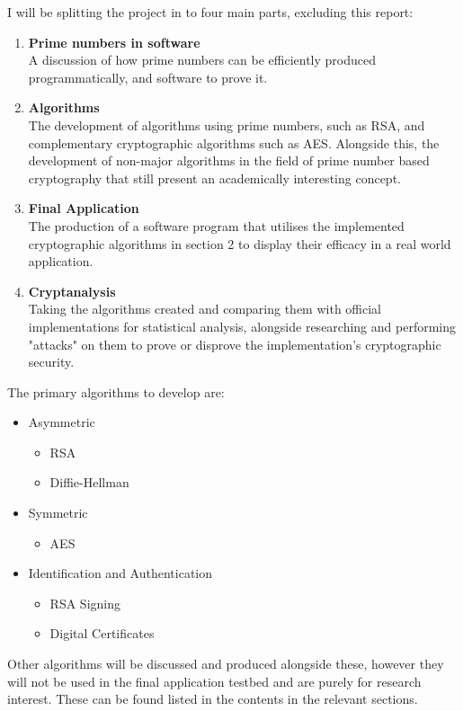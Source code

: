 I will be splitting the project in to four main parts, excluding this report:

\begin{enumerate}
	\item \textbf{Prime numbers in software} \\
		A discussion of how prime numbers can be efficiently produced programmatically, and software to prove it.
	\item \textbf{Algorithms} \\
		The development of algorithms using prime numbers, such as RSA, and complementary cryptographic algorithms such as AES. Alongside this, the development of non-major algorithms in the field of prime number based cryptography that still present an academically interesting concept.
	\item \textbf{Final Application} \\
		The production of a software program that utilises the implemented cryptographic algorithms in section 2 to display their efficacy in a real world application.
	\item \textbf{Cryptanalysis} \\
		Taking the algorithms created and comparing them with official implementations for statistical analysis, alongside researching and performing "attacks" on them to prove or disprove the implementation's cryptographic security.
\end{enumerate}

The primary algorithms to develop are:

\begin{itemize}
	\item Asymmetric
		\begin{itemize}
			\item RSA
			\item Diffie-Hellman
		\end{itemize}
	\item Symmetric
		\begin{itemize}
			\item AES
		\end{itemize}
	\item Identification and Authentication
		\begin{itemize}
			\item RSA Signing
			\item Digital Certificates
		\end{itemize}
\end{itemize}

Other algorithms will be discussed and produced alongside these, however they will not be used in the final application testbed and are purely for research interest. These can be found listed in the contents in the relevant sections.
		

